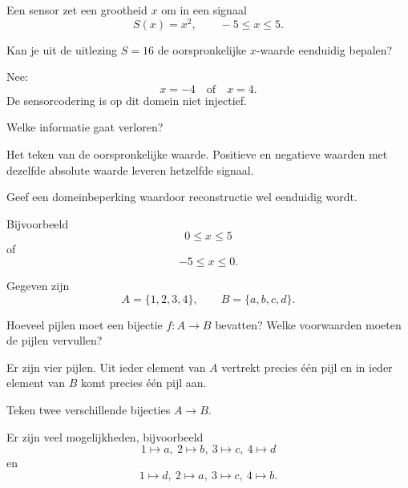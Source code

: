 \documentclass{ximera}
\begin{document}
\begin{oefening}{\oefU\ESS}

Een sensor zet een grootheid \(x\) om in een signaal
\[
S(x)=x^2,
\qquad -5\leq x\leq5.
\]

\begin{question}
Kan je uit de uitlezing \(S=16\) de oorspronkelijke \(x\)-waarde eenduidig bepalen?

\begin{oplossing}
Nee:
\[
x=-4\quad\text{of}\quad x=4.
\]
De sensorcodering is op dit domein niet injectief.
\end{oplossing}
\end{question}

\begin{question}
Welke informatie gaat verloren?

\begin{oplossing}
Het teken van de oorspronkelijke waarde. Positieve en negatieve waarden
met dezelfde absolute waarde leveren hetzelfde signaal.
\end{oplossing}
\end{question}

\begin{question}
Geef een domeinbeperking waardoor reconstructie wel eenduidig wordt.

\begin{oplossing}
Bijvoorbeeld
\[
0\leq x\leq5
\]
of
\[
-5\leq x\leq0.
\]
\end{oplossing}
\end{question}

\end{oefening}



\begin{oefening}{\oefG}

Gegeven zijn
\[
A=\{1,2,3,4\},
\qquad
B=\{a,b,c,d\}.
\]

\begin{question}
Hoeveel pijlen moet een bijectie \(f:A\to B\) bevatten?
Welke voorwaarden moeten de pijlen vervullen?

\begin{oplossing}
Er zijn vier pijlen. Uit ieder element van \(A\) vertrekt precies één pijl
en in ieder element van \(B\) komt precies één pijl aan.
\end{oplossing}
\end{question}

\begin{question}
Teken twee verschillende bijecties \(A\to B\).

\begin{oplossing}
Er zijn veel mogelijkheden, bijvoorbeeld
\[
1\mapsto a,\ 2\mapsto b,\ 3\mapsto c,\ 4\mapsto d
\]
en
\[
1\mapsto d,\ 2\mapsto a,\ 3\mapsto c,\ 4\mapsto b.
\]
\end{oplossing}
\end{question}

\end{oefening}
\end{document}
